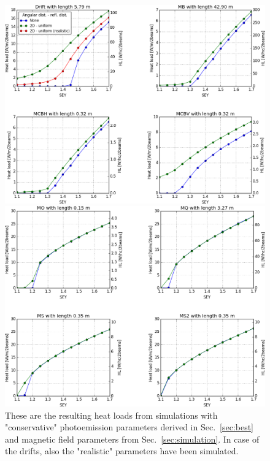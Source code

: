 \begin{figure}[tbh]
    \centering
    \begin{minipage}[c]{0.8\textwidth}
        \includegraphics[width=\textwidth]{../plots/study_2.png}
    \end{minipage}

    \vspace{0.5cm}

    \begin{minipage}[c]{0.8\textwidth}
        \includegraphics[width=\textwidth]{../plots/study_3.png}
    \end{minipage}
    \caption{These are the resulting heat loads from simulations with "conservative" photoemission parameters derived in Sec.~\ref{sec:best} and magnetic field parameters from Sec.~\ref{sec:simulation}.
    In case of the drifts, also the "realistic" parameters have been simulated.}
    \label{fig:simulation}
\end{figure}


